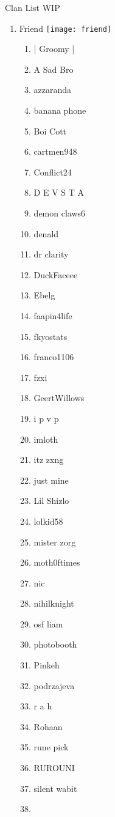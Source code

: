 \documentclass{article}
\begin{document}
Clan List WIP
\begin{enumerate}[I]
  \item 
    Friend \texttt{[image: friend]}
    \begin{enumerate}[I]
      \item
	| Groomy |
      \item
	A Sad Bro
      \item
	azzaranda
      \item
	banana phone
      \item
	Boi Cott
      \item
	cartmen948
      \item
	Conflict24
      \item
	D E V S T A
      \item
	demon claws6
      \item
	denald
      \item
	dr clarity
      \item
	DuckFaceee
      \item
	Ebelg
      \item
	faapin4life
      \item
	fkyostats
      \item
	franco1106
      \item
	fzxi
      \item
	GeertWillows
      \item
	i p v p
      \item
	imloth
      \item
	itz zxng
      \item
	just mine
      \item
	Lil Shizlo
      \item
	lolkid58
      \item
	mister zorg
      \item
	moth0ftimes
      \item
	nic
      \item
	nihilknight
      \item
	osf liam
      \item
	photobooth
      \item
	Pinkeh
      \item
	podrzajeva
      \item
	r a h
      \item
	Rohaan
      \item
	rune pick
      \item
	RUROUNI
      \item
	silent wabit
      \item

\end{enumerate}
\end{enumerate}
\end{document}
